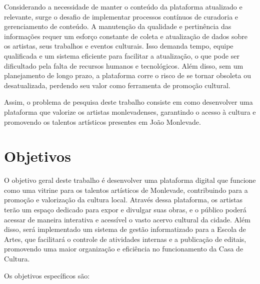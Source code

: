 Considerando a necessidade de manter o conteúdo da plataforma atualizado e relevante, surge o desafio de implementar processos contínuos de curadoria e gerenciamento de conteúdo. A manutenção da qualidade e pertinência das informações requer um esforço constante de coleta e atualização de dados sobre os artistas, seus trabalhos e eventos culturais. Isso demanda tempo, equipe qualificada e um sistema eficiente para facilitar a atualização, o que pode ser dificultado pela falta de recursos humanos e tecnológicos. Além disso, sem um planejamento de longo prazo, a plataforma corre o risco de se tornar obsoleta ou desatualizada, perdendo seu valor como ferramenta de promoção cultural.

Assim, o problema de pesquisa deste trabalho consiste em como desenvolver uma plataforma que valorize os artistas monlevadenses, garantindo o acesso à cultura e promovendo os talentos artísticos presentes em João Monlevade.

\section{Objetivos}
\label{sec:objetivos}

O objetivo geral deste trabalho é desenvolver uma plataforma digital que funcione como uma vitrine para os talentos artísticos de Monlevade, contribuindo para a promoção e valorização da cultura local. Através dessa plataforma, os artistas terão um espaço dedicado para expor e divulgar suas obras, e o público poderá acessar de maneira interativa e acessível o vasto acervo cultural da cidade. Além disso, será implementado um sistema de gestão informatizado para a Escola de Artes, que facilitará o controle de atividades internas e a publicação de editais, promovendo uma maior organização e eficiência no funcionamento da Casa de Cultura.

Os objetivos específicos são:

